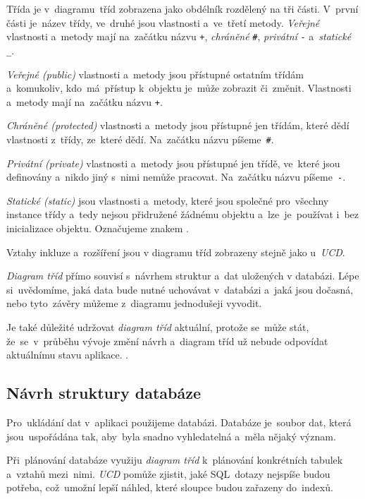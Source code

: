 \documentclass[10pt,a4paper]{article}
\begin{document}
        Třída je v~diagramu~tříd zobrazena jako obdélník rozdělený na tři části. V~první části je~název třídy, ve~druhé jsou vlastnosti a~ve~třetí metody. \emph{Veřejné} vlastnosti a~metody mají na~začátku názvu \texttt{+}, \emph{chráněné} \texttt{\#}, \emph{privátní} \texttt{-} a~\emph{statické} \texttt{\_}.
        
        \emph{Veřejné (public)} vlastnosti a~metody jsou přístupné ostatním třídám a~komukoliv, kdo~má~přístup k~objektu je~může zobrazit či~změnit. Vlastnosti a~metody mají na~začátku názvu \texttt{+}.

        \emph{Chráněné (protected)} vlastnosti a~metody jsou přístupné jen třídám, které dědí vlastnosti z~třídy, ze~které dědí. Na~začátku názvu píšeme~\texttt{\#}.
        
        \emph{Privátní (private)} vlastnosti a~metody jsou přístupné jen třídě, ve~které jsou definovány a~nikdo jiný s~nimi nemůže pracovat. Na~začátku názvu píšeme~\texttt{-}.
        
        \emph{Statické (static)} jsou vlastnosti a~metody, které jsou společné pro~všechny instance třídy a~tedy nejsou přidružené žádnému objektu a~lze~je~používat i~bez inicializace objektu. Označujeme znakem \texttt{\textunderscore}.
        
        Vztahy inkluze a~rozšíření jsou v diagramu tříd zobrazeny stejně jako u~\emph{UCD}.

        \emph{Diagram tříd} přímo souvisí s~návrhem struktur a~dat uložených v databázi. Lépe si~uvědomíme, jaká data bude nutné uchovávat v~databázi a~jaká jsou dočasná, nebo tyto~závěry můžeme z~diagramu jednodušeji vyvodit.

        Je také důležité udržovat \emph{diagram tříd} aktuální, protože se~může stát, že~se~v~průběhu vývoje změní návrh a~diagram tříd už nebude odpovídat aktuálnímu stavu aplikace. \cite{visualparadigmClassDiagram}.

        \subsection{Návrh struktury databáze}
        Pro~ukládání dat v~aplikaci použijeme databázi. Databáze je~soubor dat, která jsou~uspořádána tak, aby~byla snadno vyhledatelná a~měla nějaký význam.

        Při~plánování databáze využiju \emph{diagram tříd} k~plánování konkrétních tabulek a~vztahů mezi~nimi. \emph{UCD} pomůže zjistit, jaké SQL~dotazy nejspíše budou potřeba, což~umožní lepší náhled, které sloupce budou zařazeny do~indexů.
\end{document}
